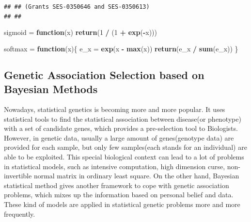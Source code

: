 \documentclass[
]{article}
\newenvironment{Shaded}{\begin{snugshade}}{\end{snugshade}}
\newcommand{\ControlFlowTok}[1]{\textcolor[rgb]{0.13,0.29,0.53}{\textbf{#1}}}
\newcommand{\DecValTok}[1]{\textcolor[rgb]{0.00,0.00,0.81}{#1}}
\newcommand{\KeywordTok}[1]{\textcolor[rgb]{0.13,0.29,0.53}{\textbf{#1}}}
\newcommand{\NormalTok}[1]{#1}
\newcommand{\OperatorTok}[1]{\textcolor[rgb]{0.81,0.36,0.00}{\textbf{#1}}}
\newcommand{\StringTok}[1]{\textcolor[rgb]{0.31,0.60,0.02}{#1}}
\begin{document}
\begin{verbatim}
## ## (Grants SES-0350646 and SES-0350613)
## ##
\end{verbatim}

\begin{Shaded}
\begin{Highlighting}[]
\NormalTok{sigmoid =}\StringTok{ }\ControlFlowTok{function}\NormalTok{(x) }\KeywordTok{return}\NormalTok{(}\DecValTok{1} \OperatorTok{/}\StringTok{ }\NormalTok{(}\DecValTok{1} \OperatorTok{+}\StringTok{ }\KeywordTok{exp}\NormalTok{(}\OperatorTok{-}\NormalTok{x)))}

\NormalTok{softmax =}\StringTok{ }\ControlFlowTok{function}\NormalTok{(x)\{}
\NormalTok{  e_x =}\StringTok{ }\KeywordTok{exp}\NormalTok{(x }\OperatorTok{-}\StringTok{ }\KeywordTok{max}\NormalTok{(x))}
  \KeywordTok{return}\NormalTok{(e_x }\OperatorTok{/}\StringTok{ }\KeywordTok{sum}\NormalTok{(e_x))}
\NormalTok{\}}
\end{Highlighting}
\end{Shaded}

\hypertarget{genetic-association-selection-based-on-bayesian-methods}{%
\subsection{Genetic Association Selection based on Bayesian
Methods}\label{genetic-association-selection-based-on-bayesian-methods}}

Nowadays, statistical genetics is becoming more and more popular. It
uses statistical tools to find the statistical association between
disease(or phenotype) with a set of candidate genes, which provides a
pre-selection tool to Biologists. However, in genetic data, usually a
large amount of genes(genotype data) are provided for each sample, but
only few samples(each stands for an individual) are able to be
exploited. This special biological context can lead to a lot of problems
in statistical models, such as intensive computation, high dimension
curse, non-invertible normal matrix in ordinary least square. On the
other hand, Bayesian statistical method gives another framework to cope
with genetic association problems, which mixes up the information based
on personal belief and data. These kind of models are applied in
statistical genetic problems more and more frequently.
\end{document}
